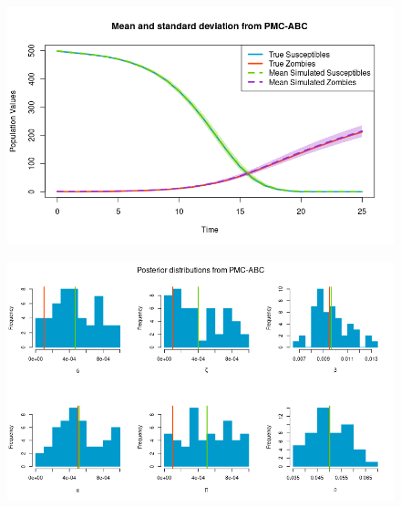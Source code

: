 \documentclass[]{article}
\begin{document}
	\begin{figure}[H]
		\centering
		\includegraphics[width=0.8\linewidth]{../Figures/PMC_ABC_sd_bands}
	\end{figure}
	
	\begin{figure}[H]
		\centering
		\includegraphics[width=1\linewidth]{../Figures/PMC_posteriors}
	\end{figure}
	
	
	
	
\end{document}

